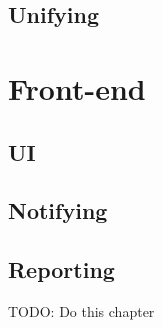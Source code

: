 \subsection{Unifying}
\section{Front-end}
\subsection{UI}
\subsection{Notifying}
\subsection{Reporting}

TODO: Do this chapter
